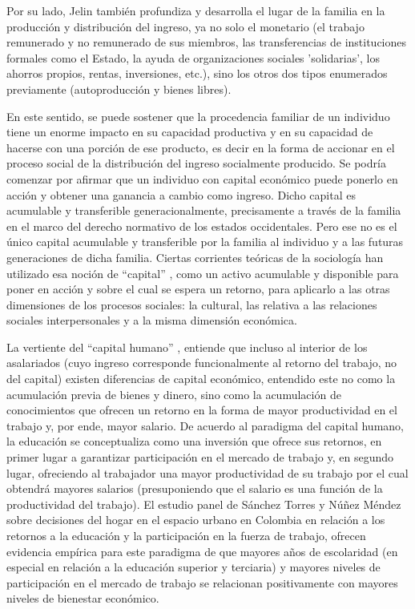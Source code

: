 	Por su lado, Jelin \cite[p.~79]{jelin} también profundiza y desarrolla el lugar de la familia en la producción y distribución del ingreso, ya no solo el monetario (el trabajo remunerado y no remunerado de sus miembros, las transferencias de instituciones formales como el Estado, la ayuda de organizaciones sociales 'solidarias', los ahorros propios, rentas, inversiones, etc.), sino los otros dos tipos enumerados previamente (autoproducción y bienes libres).
	
	En este sentido, se puede sostener que la procedencia familiar de un individuo tiene un enorme impacto en su capacidad productiva y en su capacidad de hacerse con una porción de ese producto, es decir en la forma de accionar en el proceso social de la distribución del ingreso socialmente producido. Se podría comenzar por afirmar que un individuo con capital económico puede ponerlo en acción y obtener una ganancia a cambio como ingreso. Dicho capital es acumulable y transferible generacionalmente, precisamente a través de la familia en el marco del derecho normativo de los estados occidentales. Pero ese no es el único capital acumulable y transferible por la familia al individuo y a las futuras generaciones de dicha familia. Ciertas corrientes teóricas de la sociología han utilizado esa noción de “capital” \cite{bourdieu2001}, como un activo acumulable y disponible para poner en acción y sobre el cual se espera un retorno, para aplicarlo a las otras dimensiones de los procesos sociales: la cultural, las relativa a las relaciones sociales interpersonales y a la misma dimensión económica.
	
	La vertiente del “capital humano” \cite{mincer,beckar,schultz1961,schultz1962}, entiende que incluso al interior de los asalariados (cuyo ingreso corresponde funcionalmente al retorno del trabajo, no del capital) existen diferencias de capital económico, entendido este no como la acumulación previa de bienes y dinero, sino como la acumulación de conocimientos que ofrecen un retorno en la forma de mayor productividad en el trabajo y, por ende, mayor salario. De acuerdo al paradigma del capital humano, la educación se conceptualiza como una inversión que ofrece sus retornos, en primer lugar a garantizar participación en el mercado de trabajo y, en segundo lugar, ofreciendo al trabajador una mayor productividad de su trabajo por el cual obtendrá mayores salarios (presuponiendo que el salario es una función de la productividad del trabajo). El estudio panel de Sánchez Torres y Núñez Méndez \cite{sanchez} sobre decisiones del hogar en el espacio urbano en Colombia en relación a los retornos a la educación y la participación en la fuerza de trabajo, ofrecen evidencia empírica para este paradigma de que mayores años de escolaridad (en especial en relación a la educación superior y terciaria) y mayores niveles de participación en el mercado de trabajo se relacionan positivamente con mayores niveles de bienestar económico.
	

